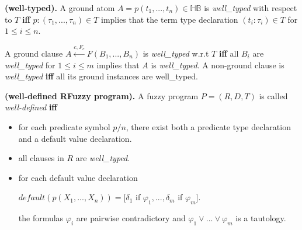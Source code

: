 \begin{defin}\textbf{(well-typed).}
\label{def:WellTyped}
A ground atom $A=p(t_1,...,t_n)\in\mathbb{HB}$ is \textit{well\_typed} with respect to $T$ \textbf{iff} $p : (\tau_1,...,\tau_n)\in T$ implies that the term type declaration $(t_i : \tau_i)\in T$ for $1 \leq i \leq n$.

A ground clause $A \stackrel{c,F_c}{\leftarrow} F(B_1,...,B_n)$ is \textit{well\_typed} w.r.t $T$ \textbf{iff} all $B_i$ are \textit{well\_typed} for $1 \leq i \leq m$ implies that $A$ is \textit{well\_typed}.
A non-ground clause is \textit{well\_typed} \textbf{iff} all its ground instances are well\_typed. 
\end{defin}

\begin{defin}\textbf{(well-defined RFuzzy program).}
\label{def:WellDefinedProgram}
A fuzzy program $P=(R,D,T)$ is called \textit{well-defined} \textbf{iff}

\begin{itemize}
 
 \item for each predicate symbol $p/n$, there exist both a predicate type declaration and a default value declaration. 
 \item all clauses in $R$ are \textit{well\_typed}.
 \item for each default value declaration 
\begin{center}
 $default(p(X_1,...,X_n))=[\delta_1$ if $\varphi_1,..., \delta_m$ if $\varphi_m]$.
\end{center}
the formulas $\varphi_i$ are pairwise contradictory and $\varphi_1 \vee ... \vee \varphi_m$ is a tautology.
   
\end{itemize}

 
\end{defin}


